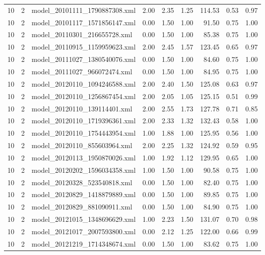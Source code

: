 \begin{table}[ht]
\begin{tabular}{rrlrrrrrr}
   10 &   2 & model\_20101111\_1790887308.xml & 2.00 & 2.35 & 1.25 & 114.53 & 0.53 & 0.97 \\ 
   10 &   2 & model\_20101117\_1571856147.xml & 0.00 & 1.50 & 1.00 & 91.50 & 0.75 & 1.00 \\ 
   10 &   2 & model\_20110301\_216655728.xml & 0.00 & 1.50 & 1.00 & 85.38 & 0.75 & 1.00 \\ 
   10 &   2 & model\_20110915\_1159959623.xml & 2.00 & 2.45 & 1.57 & 123.45 & 0.65 & 0.97 \\ 
   10 &   2 & model\_20111027\_1380540076.xml & 0.00 & 1.50 & 1.00 & 84.60 & 0.75 & 1.00 \\ 
   10 &   2 & model\_20111027\_966072474.xml & 0.00 & 1.50 & 1.00 & 84.95 & 0.75 & 1.00 \\ 
   10 &   2 & model\_20120110\_1094246588.xml & 2.00 & 2.40 & 1.50 & 125.08 & 0.63 & 0.97 \\ 
   10 &   2 & model\_20120110\_1256867454.xml & 2.00 & 2.05 & 1.05 & 125.15 & 0.51 & 0.99 \\ 
   10 &   2 & model\_20120110\_139114401.xml & 2.00 & 2.55 & 1.73 & 127.78 & 0.71 & 0.85 \\ 
   10 &   2 & model\_20120110\_1719396361.xml & 2.00 & 2.33 & 1.32 & 132.43 & 0.58 & 1.00 \\ 
   10 &   2 & model\_20120110\_1754443954.xml & 1.00 & 1.88 & 1.00 & 125.95 & 0.56 & 1.00 \\ 
   10 &   2 & model\_20120110\_855603964.xml & 2.00 & 2.25 & 1.32 & 124.92 & 0.59 & 0.95 \\ 
   10 &   2 & model\_20120113\_1950870026.xml & 1.00 & 1.92 & 1.12 & 129.95 & 0.65 & 1.00 \\ 
   10 &   2 & model\_20120202\_1596034358.xml & 1.00 & 1.50 & 1.00 & 90.58 & 0.75 & 1.00 \\ 
   10 &   2 & model\_20120328\_523540818.xml & 0.00 & 1.50 & 1.00 & 82.40 & 0.75 & 1.00 \\ 
   10 &   2 & model\_20120829\_1418879889.xml & 0.00 & 1.50 & 1.00 & 89.85 & 0.75 & 1.00 \\ 
   10 &   2 & model\_20120829\_881090911.xml & 0.00 & 1.50 & 1.00 & 84.90 & 0.75 & 1.00 \\ 
   10 &   2 & model\_20121015\_1348696629.xml & 1.00 & 2.23 & 1.50 & 131.07 & 0.70 & 0.98 \\ 
   10 &   2 & model\_20121017\_2007593800.xml & 0.00 & 2.12 & 1.25 & 122.00 & 0.66 & 0.99 \\ 
   10 &   2 & model\_20121219\_1714348674.xml & 0.00 & 1.50 & 1.00 & 83.62 & 0.75 & 1.00 \\ 

\end{tabular}
\end{table}
